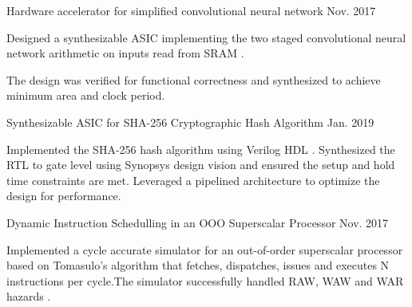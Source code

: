 \begin{cvprojects}
    \par\addvspace{0ex}
    \begin{flushleft}
    \par\addvspace{-1.5mm}
    \fontsize{10.4pt}{1em}\selectfont{}
    \end{flushleft}
    \par\addvspace{0.3ex}

    \cvproject
    {Hardware accelerator for simplified convolutional neural network }
    {\color{darkgray}Nov. 2017}
    {
      \begin{cvprojectitems}
        \item {Designed a synthesizable ASIC implementing the two staged convolutional neural network arithmetic on inputs read from SRAM . }
        \item {The design was verified for functional correctness and synthesized to achieve minimum area and clock period.} 
      \end{cvprojectitems}
    }

     \cvproject
    {Synthesizable ASIC for SHA-256 Cryptographic Hash Algorithm }
    {\color{darkgray}Jan. 2019}
    {
      \begin{cvprojectitems}
        \item {Implemented the SHA-256 hash algorithm using Verilog HDL . Synthesized the RTL to gate level using Synopsys design vision and ensured the setup and hold time constraints are met. Leveraged a pipelined architecture to optimize the design for performance. }
      \end{cvprojectitems}
    }

    \par\addvspace{1ex}
    \begin{flushleft}
    \par\addvspace{-1.5mm}
    \fontsize{10.4pt}{1em}\selectfont{}
    \end{flushleft}
    \par\addvspace{0.3ex}
    \cvproject
    {Dynamic Instruction Schedulling in an OOO Superscalar Processor }
    {\color{darkgray}Nov. 2017}
    {
      \begin{cvprojectitems}
        \item {Implemented a cycle accurate simulator for an out-of-order superscalar processor based on Tomasulo’s algorithm that fetches, dispatches, issues and executes N instructions per cycle.The simulator successfully handled RAW, WAW and WAR hazards .}
      \end{cvprojectitems}
    }


\end{cvprojects}
